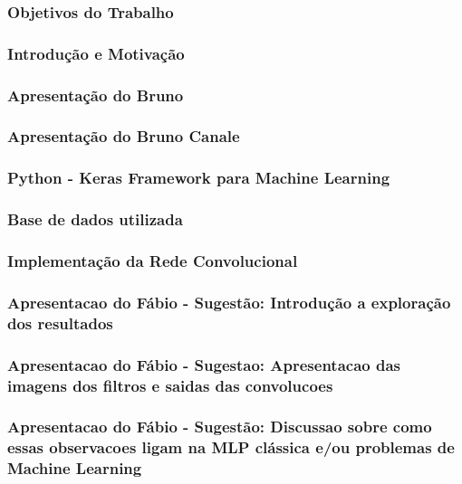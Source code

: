 \documentclass[11pt]{beamer}
\begin{document}
	\frame[plain]{\maketitle}

    \begin{frame}
      \frametitle{Objetivos do Trabalho}
    \end{frame}

    \begin{frame}
      \frametitle{Introdução e Motivação}
    \end{frame}

    \begin{frame}
      \frametitle{Apresentação do Bruno}
    \end{frame}

    \begin{frame}
      \frametitle{Apresentação do Bruno Canale}
    \end{frame}

	\begin{frame}
      \frametitle{Python - Keras Framework para Machine Learning}
    \end{frame}

    \begin{frame}
      \frametitle{Base de dados utilizada}
    \end{frame}

    \begin{frame}
      \frametitle{Implementação da Rede Convolucional}
    \end{frame}

    \begin{frame}
      \frametitle{Apresentacao do Fábio - Sugestão: Introdução a exploração dos resultados}
    \end{frame}

    \begin{frame}
      \frametitle{Apresentacao do Fábio - Sugestao: Apresentacao das
        imagens dos filtros e saidas das convolucoes}
    \end{frame}

    \begin{frame}
      \frametitle{Apresentacao do Fábio - Sugestão: Discussao sobre
        como essas observacoes ligam na MLP clássica e/ou problemas de
        Machine Learning}
    \end{frame}
    
\end{document}
